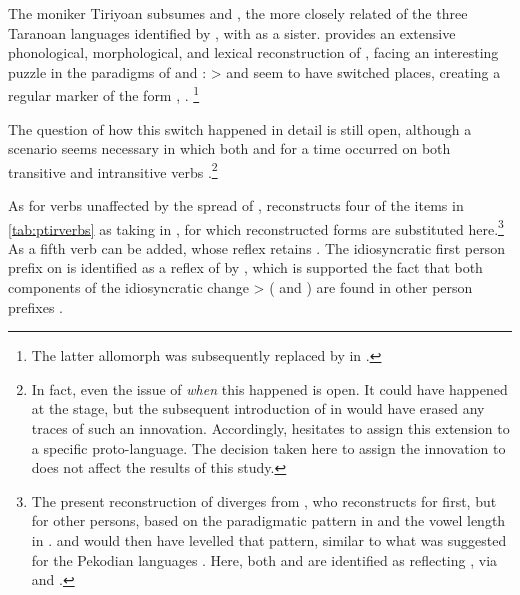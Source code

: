 


\subsubsection{\PTir {}}
\label{sec:taranoan}
The moniker Tiriyoan \parencite{glottolog} subsumes \trio and \akuriyo, the more closely related of the three Taranoan languages identified by \textcite{girard1971proto}, with \carijo as a sister.
\textcite{meira1998proto} provides an extensive phonological, morphological, and lexical reconstruction of \PTar, facing an interesting puzzle in the \setone paradigms of \trio and \akuriyo: \PC {}>  and   seem to have switched places, creating a regular  marker of the form ,  .%
\footnote{The latter allomorph was subsequently replaced by  in \akuriyo {}.}

The question of how this switch happened in detail \parencite[107--112]{meira1998proto} is still open, although a scenario seems necessary in which both  and  for a time occurred on both transitive and intransitive verbs \parencite[112]{meira1998proto}.\footnote{
In fact, even the issue of \emph{when} this happened is open.
It could have happened at the \PTar stage, but the subsequent introduction of  in \carijo {} would have erased any traces of such an innovation.
Accordingly, \textcite{meira1998proto} hesitates to assign this extension to a specific proto-language.
The decision taken here to assign the innovation to \PTir does not affect the results of this study.}



As for verbs unaffected by the spread of , \textcite{meira1998proto} reconstructs four of the items in \cref{tab:ptirverbs} as taking  in \PTar, for which reconstructed \PTir forms are substituted here.\footnote{The present reconstruction of  diverges from , who reconstructs \PTar {} for first, but  for other persons, based on the paradigmatic pattern in \trio and the vowel length in \akuriyo.
\akuriyo and \carijo would then have levelled that pattern, similar to what was suggested for the Pekodian languages .
Here, both \trio {} and \akuriyo {} are identified as reflecting  , via \PTar {} and \PTir {}.}
As a fifth verb   can be added, whose \trio reflex retains .
The idiosyncratic \akuriyo first person prefix  on  is identified as a reflex of  by 
\textcite[113]{meira1998proto}, which is supported the fact that both components of the idiosyncratic change  >  ( and ) are found in other person prefixes .

